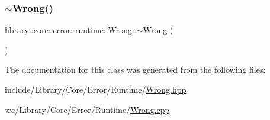 \mbox{\label{classlibrary_1_1core_1_1error_1_1runtime_1_1_wrong_a6cdcfe31f32807b295695b9bd288d1cf}} 
\subsubsection{\texorpdfstring{$\sim$\+Wrong()}{~Wrong()}}
{\footnotesize\ttfamily library\+::core\+::error\+::runtime\+::\+Wrong\+::$\sim$\+Wrong (\begin{DoxyParamCaption}{ }\end{DoxyParamCaption})}



The documentation for this class was generated from the following files\+:\begin{DoxyCompactItemize}
\item 
include/\+Library/\+Core/\+Error/\+Runtime/\hyperlink{_wrong_8hpp}{Wrong.\+hpp}\item 
src/\+Library/\+Core/\+Error/\+Runtime/\hyperlink{_wrong_8cpp}{Wrong.\+cpp}\end{DoxyCompactItemize}
